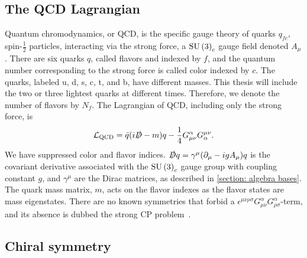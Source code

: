 \subsection{The QCD Lagrangian}

Quantum chromodynamics, or QCD, is the specific gauge theory of quarks $q_{fc}$, spin-$\frac{1}{2}$ particles, interacting via the strong force, a $\text{SU}\left(3\right)_c$ gauge field denoted $A_\mu$.
There are six quarks $q$, called flavors and indexed by $f$, and the quantum number corresponding to the strong force is called color indexed by $c$.
The quarks, labeled u, d, s, c, t, and b, have different masses.
This thesis will include the two or three lightest quarks at different times.
Therefore, we denote the number of flavors by $N_f$.
The Lagrangian of QCD, including only the strong force, is
%
\begin{equation}
    \mathcal{L}_{\text{QCD}} 
    = \bar q (i \slashed D - m)q - \frac{1}{4} G_{\mu \nu}^\alpha G^{\mu \nu}_\alpha.
\end{equation}
%
We have suppressed color and flavor indices.
$\slashed D q = \gamma^\mu (\partial_\mu - i g A_\mu) q$ is the covariant derivative associated with the $\text{SU}\left(3\right)_c$ gauge group with coupling constant $g$, and $\gamma^\mu$ are the Dirac matrices, as described in \autoref{section: algebra bases}.
The quark mass matrix, $m$, acts on the flavor indexes as the flavor states are mass eigenstates.
There are no known symmetries that forbid a $\epsilon^{\mu \nu \rho \sigma} G_{\mu \nu}^\alpha G_{\rho \sigma}^\alpha$-term, and its absence is dubbed the strong CP problem~\autocite{schwartzQuantumFieldTheory2013}.



\subsection{Chiral symmetry}


